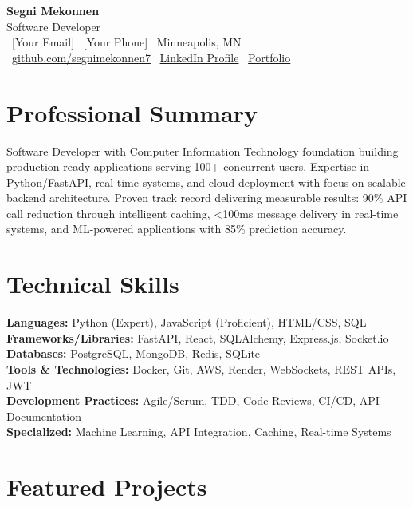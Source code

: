 \documentclass[11pt,letterpaper]{article}
\begin{document}
\begin{center}
    {\Huge \textbf{Segni Mekonnen}} \\
    \vspace{5pt}
    {\large Software Developer} \\
    \vspace{8pt}
    \faEnvelope\ [Your Email] \quad
    \faPhone\ [Your Phone] \quad
    \faMapMarker\ Minneapolis, MN \\
    \faGithub\ \href{https://github.com/segnimekonnen7}{github.com/segnimekonnen7} \quad
    \faLinkedin\ \href{https://linkedin.com/in/yourprofile}{LinkedIn Profile} \quad
    \faGlobe\ \href{https://yourportfolio.com}{Portfolio}
\end{center}

\section{Professional Summary}
Software Developer with Computer Information Technology foundation building production-ready applications serving 100+ concurrent users. Expertise in Python/FastAPI, real-time systems, and cloud deployment with focus on scalable backend architecture. Proven track record delivering measurable results: 90\% API call reduction through intelligent caching, <100ms message delivery in real-time systems, and ML-powered applications with 85\% prediction accuracy.

\section{Technical Skills}
\textbf{Languages:} Python (Expert), JavaScript (Proficient), HTML/CSS, SQL \\
\textbf{Frameworks/Libraries:} FastAPI, React, SQLAlchemy, Express.js, Socket.io \\
\textbf{Databases:} PostgreSQL, MongoDB, Redis, SQLite \\
\textbf{Tools \& Technologies:} Docker, Git, AWS, Render, WebSockets, REST APIs, JWT \\
\textbf{Development Practices:} Agile/Scrum, TDD, Code Reviews, CI/CD, API Documentation \\
\textbf{Specialized:} Machine Learning, API Integration, Caching, Real-time Systems

\section{Featured Projects}
\end{document}
